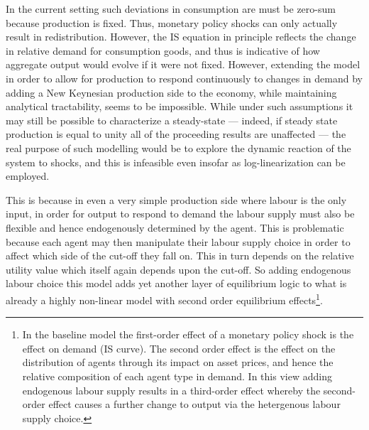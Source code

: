 \documentclass{article}
\begin{document}
In the current setting such deviations in consumption are must be zero-sum because production is fixed. Thus, monetary policy shocks can only actually result in redistribution. However, the IS equation in principle reflects the change in relative demand for consumption goods, and thus is indicative of how aggregate output would evolve if it were not fixed. However, extending the model in order to allow for production to respond continuously to changes in demand by adding a New Keynesian production side to the economy, while maintaining analytical tractability, seems to be impossible. While under such assumptions it may still be possible to characterize a steady-state --- indeed, if steady state production is equal to unity all of the proceeding results are unaffected --- the real purpose of such modelling would be to explore the dynamic reaction of the system to shocks, and this is infeasible even insofar as log-linearization can be employed.

This is because in even a very simple production side where labour is the only input, in order for output to respond to demand the labour supply must also be flexible and hence endogenously determined by the agent. This is problematic because each agent may then manipulate their labour supply choice in order to affect which side of the cut-off they fall on. This in turn depends on the relative utility value which itself again depends upon the cut-off. So adding endogenous labour choice this model adds yet another layer of equilibrium logic to what is already a highly non-linear model with second order equilibrium effects\footnote{In the baseline model the first-order effect of a monetary policy shock is the effect on demand (IS curve). The second order effect is the effect on the distribution of agents through its impact on asset prices, and hence the relative composition of each agent type in demand. In this view adding endogenous labour supply results in a third-order effect whereby the second-order effect causes a further change to output via the hetergenous labour supply choice.}.
\end{document}
